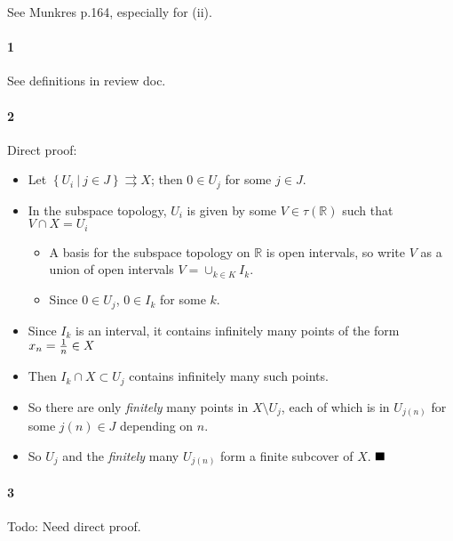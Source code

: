 \begin{solution}

\hfill

\begin{concept}

See Munkres p.164, especially for (ii).

\end{concept}

\hypertarget{section-3}{%
\paragraph{1}\label{section-3}}

See definitions in review doc.

\hypertarget{section-4}{%
\paragraph{2}\label{section-4}}

Direct proof:

\begin{itemize}
\tightlist
\item
  Let
  \(\left\{{U_i {~\mathrel{\Big|}~}j\in J}\right\}\rightrightarrows X\);
  then \(0\in U_j\) for some \(j\in J\).
\item
  In the subspace topology, \(U_i\) is given by some
  \(V\in \tau({\mathbb{R}})\) such that \(V\cap X = U_i\)

  \begin{itemize}
  \tightlist
  \item
    A basis for the subspace topology on \({\mathbb{R}}\) is open
    intervals, so write \(V\) as a union of open intervals
    \(V = \cup_{k\in K} I_k\).
  \item
    Since \(0\in U_j\), \(0\in I_k\) for some \(k\).
  \end{itemize}
\item
  Since \(I_k\) is an interval, it contains infinitely many points of
  the form \(x_n = {1 \over n} \in X\)
\item
  Then \(I_k \cap X \subset U_j\) contains infinitely many such points.
\item
  So there are only \emph{finitely} many points in \(X\setminus U_j\),
  each of which is in \(U_{j(n)}\) for some \(j(n) \in J\) depending on
  \(n\).
\item
  So \(U_j\) and the \emph{finitely} many \(U_{j(n)}\) form a finite
  subcover of \(X\). \(\hfill\blacksquare\)
\end{itemize}

\hypertarget{section-5}{%
\paragraph{3}\label{section-5}}

Todo: Need direct proof.

\end{solution}

